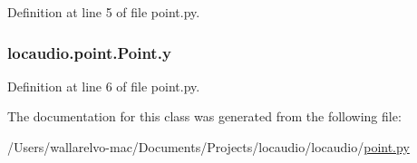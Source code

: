 Definition at line 5 of file point.\-py.

\hypertarget{classlocaudio_1_1point_1_1Point_a714d448f12192ca6d947e7109fb8f538}{
\subsubsection[{y}]{\setlength{\rightskip}{0pt plus 5cm}locaudio.\-point.\-Point.\-y}}\label{classlocaudio_1_1point_1_1Point_a714d448f12192ca6d947e7109fb8f538}


Definition at line 6 of file point.\-py.



The documentation for this class was generated from the following file\-:\begin{DoxyCompactItemize}
\item 
/\-Users/wallarelvo-\/mac/\-Documents/\-Projects/locaudio/locaudio/\hyperlink{point_8py}{point.\-py}\end{DoxyCompactItemize}
